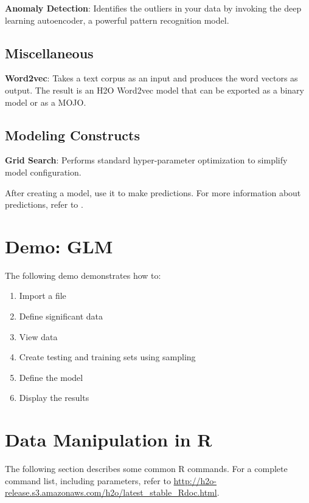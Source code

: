 {{{\textbf{Anomaly Detection}}: Identifies the outliers in your data by invoking the deep learning autoencoder, a powerful pattern recognition model.

\subsection{Miscellaneous}
{\textbf{Word2vec}}: Takes a text corpus as an input and produces the word vectors as output. The result is an H2O Word2vec model that can be exported as a binary model or as a MOJO.


\subsection{Modeling Constructs}

{\textbf{Grid Search}}: Performs standard hyper-parameter optimization to simplify model configuration.

After creating a model, use it to make predictions. For more information about predictions, refer to {\textbf{}}.


\section{Demo: GLM}

The following demo demonstrates how to:

\begin{enumerate}
\item  Import a file
\item Define significant data
\item View data
\item Create testing and training sets using sampling
\item Define the model
\item Display the results
\end{enumerate}

\newpage


\newpage
\section{Data Manipulation in R}

The following section describes some common R commands. For a complete command list, including parameters, refer to {\url{http://h2o-release.s3.amazonaws.com/h2o/latest_stable_Rdoc.html}}.

}}
